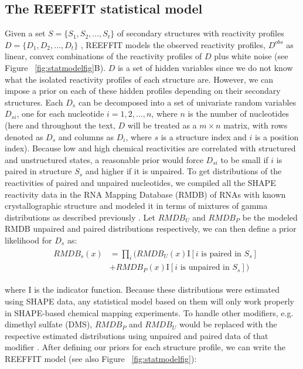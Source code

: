 \documentclass[12pt]{article}
\begin{document}
\subsection{The REEFFIT statistical model}
Given a set $S =  \{ S_1, S_2, …, S_{t} \}$ of secondary structures with reactivity profiles $D = \{ D_{1}, D_{2}, ..., D_{t} \}$ , REEFFIT models the observed reactivity profiles, $D^{obs}$ as linear, convex combinations of the reactivity profiles of $D$ plus white noise (see Figure ~\ref{fig:statmodelfig}B). $D$ is a set of hidden variables since we do not know what the isolated reactivity profiles of each structure are. However, we can impose a prior on each of these hidden profiles depending on their secondary structures. Each $D_{s}$ can be decomposed into a set of univariate random variables $D_{si}$, one for each nucleotide $i = 1, 2, ..., n$, where $n$ is the number of nucleotides (here and throughout the text, $D$ will be treated as a $m \times n$ matrix, with rows denoted as $D_{s}$ and columns as $D_{i}$, where $s$ is a structure index and $i$ is a position index). Because low and high chemical reactivities are correlated with structured and unstructured states, a reasonable prior would force $D_{si}$ to be small if $i$ is paired in structure $S_s$ and higher if it is unpaired. To get distributions of the reactivities of paired and unpaired nucleotides, we compiled all the SHAPE reactivity data in the RNA Mapping Database (RMDB) \cite{Cordero2012} of RNAs with known crystallographic structure and modeled it in terms of mixtures of gamma distributions as described previously \cite{Cordero2012a}. Let $RMDB_U$ and $RMDB_P$ be the modeled RMDB unpaired and paired distributions respectively, we can then define a prior likelihood for $D_{s}$ as: 
\begin{align}
  &\begin{aligned}
RMDB_{s}(x) &= \prod_i (RMDB_U(x) \mbox{I}\left[i \mbox{ is paired in } S_s\right]\\ 
                &+ RMDB_P(x) \mbox{I}\left[i \mbox{ is unpaired in } S_s\right])
  \end{aligned}
\end{align}

where $\mbox{I}$ is the indicator function. Because these distributions were estimated using SHAPE data, any statistical model based on them will only work properly in SHAPE-based chemical mapping experiments. To handle other modifiers, e.g. dimethyl sulfate (DMS), $RMDB_P$ and $RMDB_U$ would be replaced with the respective estimated distributions using unpaired and paired data of that modifier \cite{Cordero2012a}. After defining our priors for each structure profile, we can write the REEFFIT model (see also Figure ~\ref{fig:statmodelfig}):
\end{document}
